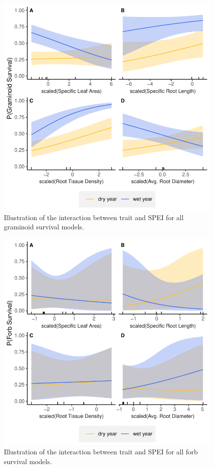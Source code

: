 \documentclass[12pt, letterpaper]{article}
\begin{document}
\begin{figure}
\includegraphics[width=1\textwidth]{images/AllTraitsSurv_Grams.pdf}
\caption{\small{
Illustration of the interaction between trait and SPEI for all graminoid survival models.
}}
\label{fig:GramSurv_all}
\end{figure}

\begin{figure}
\includegraphics[width=1\textwidth]{images/AllTraitsSurv_Forbs.pdf}
\caption{\small{
Illustration of the interaction between trait and SPEI for all forb survival models.
}}
\label{fig:ForbSurv_all}
\end{figure}
\end{document}
